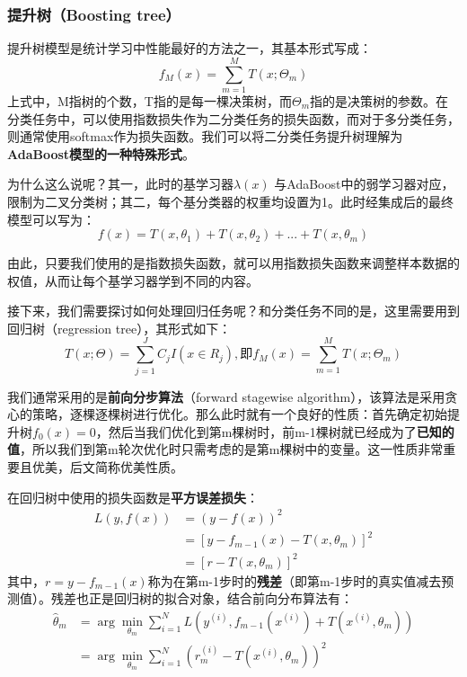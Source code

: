 \subsubsection{提升树（Boosting tree）}
提升树模型是统计学习中性能最好的方法之一，其基本形式写成：
\begin{equation}f_M(x)=\sum_{m=1}^MT(x;\Theta_m)\end{equation}
上式中，M指树的个数，T指的是每一棵决策树，而$\Theta_m$指的是决策树的参数。在分类任务中，可以使用指数损失作为二分类任务的损失函数，而对于多分类任务，则通常使用softmax作为损失函数。我们可以将二分类任务提升树理解为\textbf{AdaBoost模型的一种特殊形式}。

为什么这么说呢？其一，此时的基学习器$\lambda(x)$ 与AdaBoost中的弱学习器对应，限制为二叉分类树；其二，每个基分类器的权重均设置为1。此时经集成后的最终模型可以写为：
\begin{equation}f(x)=T(x,\theta_1)+T(x,\theta_2)+...+T(x,\theta_m)\end{equation}

由此，只要我们使用的是指数损失函数，就可以用指数损失函数来调整样本数据的权值，从而让每个基学习器学到不同的内容。

接下来，我们需要探讨如何处理回归任务呢？和分类任务不同的是，这里需要用到回归树（regression tree），其形式如下：
\begin{equation}T(x;\Theta)=\sum_{j=1}^JC_jI(x\in R_j),\text{即}f_M(x)=\sum_{m=1}^MT(x;\Theta_m)\end{equation}

我们通常采用的是\textbf{前向分步算法}（forward stagewise algorithm），该算法是采用贪心的策略，逐棵逐棵树进行优化。那么此时就有一个良好的性质：首先确定初始提升树$f_0(x)=0$，然后当我们优化到第m棵树时，前m-1棵树就已经成为了\textbf{已知的值}，所以我们到第m轮次优化时只需考虑的是第m棵树中的变量。这一性质非常重要且优美，后文简称优美性质。

在回归树中使用的损失函数是\textbf{平方误差损失}：
\begin{equation}
	\begin{aligned}
		L(y,f(x)) &= (y - f(x))^2 \\
		&= [y - f_{m-1}(x) - T(x, \theta_m)]^2 \\
		&= [r - T(x, \theta_m)]^2
	\end{aligned}
\end{equation}
其中，$r=y-f_{m-1}(x)$称为在第m-1步时的\textbf{残差}（即第m-1步时的真实值减去预测值）。残差也正是回归树的拟合对象，结合前向分布算法有：
\begin{equation}
	\begin{aligned}
		\hat{\theta}_m &= \arg\min_{\theta_m} \sum_{i=1}^N L\left(y^{(i)}, f_{m-1}(x^{(i)}) + T(x^{(i)}, \theta_m)\right) \\
		&= \arg\min_{\theta_m} \sum_{i=1}^N \left(r_m^{(i)} - T(x^{(i)}, \theta_m)\right)^2
	\end{aligned}
\end{equation}

